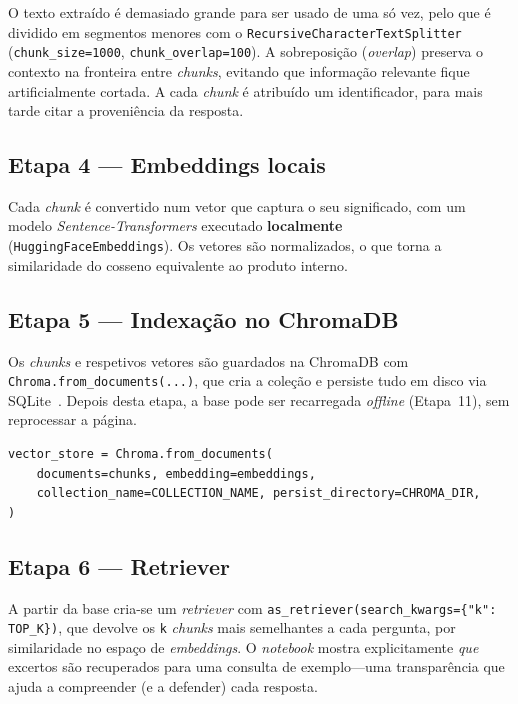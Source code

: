 \documentclass[]{ceurart}
\begin{document}
O texto extraído é demasiado grande para ser usado de uma só vez, pelo que é
dividido em segmentos menores com o \texttt{RecursiveCharacterTextSplitter}
(\texttt{chunk\_size=1000}, \texttt{chunk\_overlap=100}).
A sobreposição (\emph{overlap}) preserva o contexto na fronteira entre
\emph{chunks}, evitando que informação relevante fique artificialmente cortada.
A cada \emph{chunk} é atribuído um identificador, para mais tarde citar a
proveniência da resposta.

\subsection*{Etapa 4 --- Embeddings locais}

Cada \emph{chunk} é convertido num vetor que captura o seu significado, com um
modelo \emph{Sentence-Transformers} executado \textbf{localmente}
(\texttt{HuggingFaceEmbeddings}). Os vetores são normalizados, o que torna a
similaridade do cosseno equivalente ao produto interno.

\subsection*{Etapa 5 --- Indexação no ChromaDB}

Os \emph{chunks} e respetivos vetores são guardados na ChromaDB com
\texttt{Chroma.from\_documents(...)}, que cria a coleção e persiste tudo em disco
via SQLite~\cite{chromadb}. Depois desta etapa, a base pode ser recarregada
\emph{offline} (Etapa~11), sem reprocessar a página.

\begin{lstlisting}
vector_store = Chroma.from_documents(
    documents=chunks, embedding=embeddings,
    collection_name=COLLECTION_NAME, persist_directory=CHROMA_DIR,
)
\end{lstlisting}

\subsection*{Etapa 6 --- Retriever}

A partir da base cria-se um \emph{retriever} com
\texttt{as\_retriever(search\_kwargs=\{"k": TOP\_K\})}, que devolve os \texttt{k}
\emph{chunks} mais semelhantes a cada pergunta, por similaridade no espaço de
\emph{embeddings}. O \emph{notebook} mostra explicitamente \emph{que} excertos
são recuperados para uma consulta de exemplo---uma transparência que ajuda a
compreender (e a defender) cada resposta.
\end{document}

